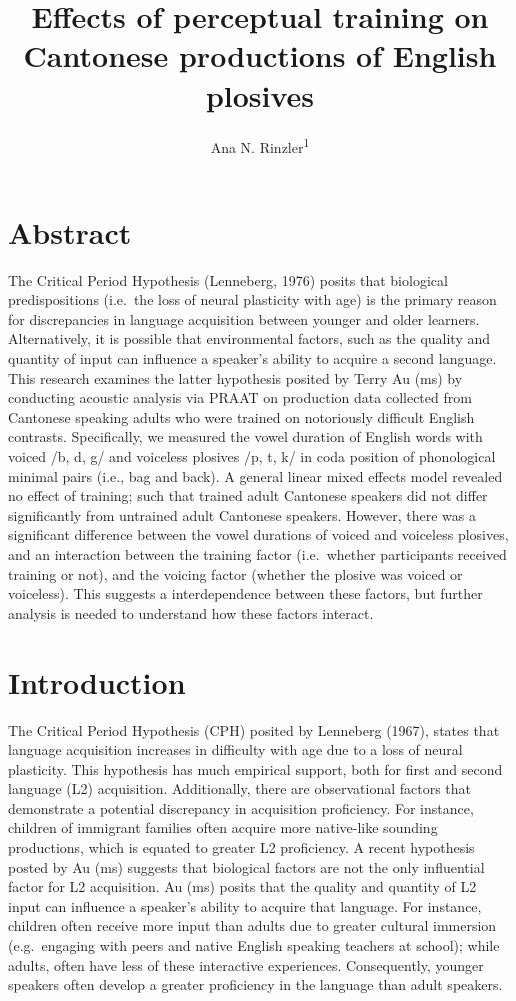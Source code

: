 \documentclass[man]{apa6}
\title{Effects of perceptual training on Cantonese productions of English
plosives}
\author{Ana N. Rinzler\textsuperscript{1}}
\affiliation{
    \vspace{0.5cm}
          \textsuperscript{1} Rutgers University, the State University of New Jersey\\
          \textsuperscript{}   }
\theoremstyle{definition}
\theoremstyle{definition}
\theoremstyle{definition}
\theoremstyle{remark}
\begin{document}
\maketitle

\setcounter{secnumdepth}{0}



\section{Abstract}\label{abstract}

The Critical Period Hypothesis (Lenneberg, 1976) posits that biological
predispositions (i.e.~the loss of neural plasticity with age) is the
primary reason for discrepancies in language acquisition between younger
and older learners. Alternatively, it is possible that environmental
factors, such as the quality and quantity of input can influence a
speaker's ability to acquire a second language. This research examines
the latter hypothesis posited by Terry Au (ms) by conducting acoustic
analysis via PRAAT on production data collected from Cantonese speaking
adults who were trained on notoriously difficult English contrasts.
Specifically, we measured the vowel duration of English words with
voiced /b, d, g/ and voiceless plosives /p, t, k/ in coda position of
phonological minimal pairs (i.e., bag and back). A general linear mixed
effects model revealed no effect of training; such that trained adult
Cantonese speakers did not differ significantly from untrained adult
Cantonese speakers. However, there was a significant difference between
the vowel durations of voiced and voiceless plosives, and an interaction
between the training factor (i.e.~whether participants received training
or not), and the voicing factor (whether the plosive was voiced or
voiceless). This suggests a interdependence between these factors, but
further analysis is needed to understand how these factors interact.

\section{Introduction}\label{introduction}

The Critical Period Hypothesis (CPH) posited by Lenneberg (1967), states
that language acquisition increases in difficulty with age due to a loss
of neural plasticity. This hypothesis has much empirical support, both
for first and second language (L2) acquisition. Additionally, there are
observational factors that demonstrate a potential discrepancy in
acquisition proficiency. For instance, children of immigrant families
often acquire more native-like sounding productions, which is equated to
greater L2 proficiency. A recent hypothesis posted by Au (ms) suggests
that biological factors are not the only influential factor for L2
acquisition. Au (ms) posits that the quality and quantity of L2 input
can influence a speaker's ability to acquire that language. For
instance, children often receive more input than adults due to greater
cultural immersion (e.g.~engaging with peers and native English speaking
teachers at school); while adults, often have less of these interactive
experiences. Consequently, younger speakers often develop a greater
proficiency in the language than adult speakers.
\end{document}
